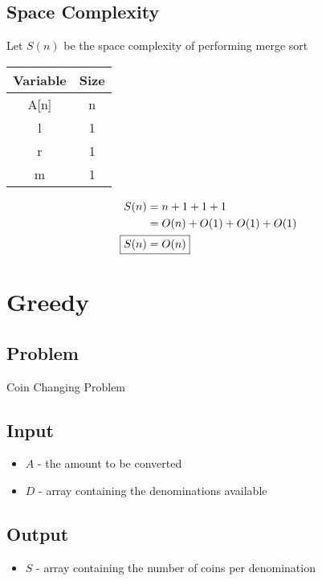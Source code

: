 \documentclass[12pt]{article}%
\begin{document}
  \subsection{Space Complexity}
      Let $S(n)$ be the space complexity of performing merge sort
      \begin{table}[H]
      \centering
      \begin{tabular}{|c|c|}
      \hline
      \textbf{Variable} & \textbf{Size} \\ \hline
      A[n]              & n             \\ \hline
      l                 & 1             \\ \hline
      r                 & 1             \\ \hline
      m                 & 1             \\ \hline
      \end{tabular}
      \end{table}

      \begin{align*}
        S(n) &= n + 1 + 1 + 1 \\
        &= O(n) + O(1) + O(1) + O(1) \\
        \Aboxed{S(n) &= O(n)}
      \end{align*}
\newpage

\section{Greedy}
  \subsection{Problem}
      Coin Changing Problem 
  \subsection{Input}
      \begin{itemize}
        \item $A$ - the amount to be converted
        \item $D$ - array containing the denominations available
      \end{itemize}
  \subsection{Output}
      \begin{itemize}
        \item $S$ - array containing the number of coins per denomination
      \end{itemize}
\end{document}
